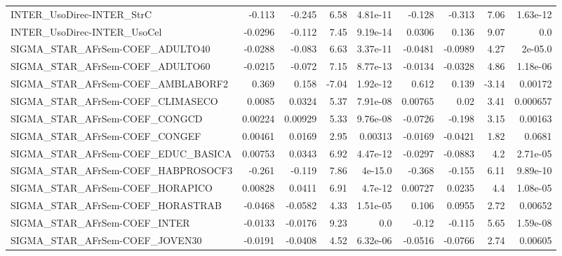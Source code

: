 \begin{tabular}{lrrrrrrrr}
INTER\_UsoDirec-INTER\_StrC              &      -0.113 &       -0.245 &     6.58 & 4.81e-11 &     -0.128 &      -0.313 &         7.06 &      1.63e-12 \\
INTER\_UsoDirec-INTER\_UsoCel            &     -0.0296 &       -0.112 &     7.45 & 9.19e-14 &     0.0306 &       0.136 &         9.07 &           0.0 \\
SIGMA\_STAR\_AFrSem-COEF\_ADULTO40        &     -0.0288 &       -0.083 &     6.63 & 3.37e-11 &    -0.0481 &     -0.0989 &         4.27 &       2e-05.0 \\
SIGMA\_STAR\_AFrSem-COEF\_ADULTO60        &     -0.0215 &       -0.072 &     7.15 & 8.77e-13 &    -0.0134 &     -0.0328 &         4.86 &      1.18e-06 \\
SIGMA\_STAR\_AFrSem-COEF\_AMBLABORF2      &       0.369 &        0.158 &    -7.04 & 1.92e-12 &      0.612 &       0.139 &        -3.14 &       0.00172 \\
SIGMA\_STAR\_AFrSem-COEF\_CLIMASECO       &      0.0085 &       0.0324 &     5.37 & 7.91e-08 &    0.00765 &        0.02 &         3.41 &      0.000657 \\
SIGMA\_STAR\_AFrSem-COEF\_CONGCD          &     0.00224 &      0.00929 &     5.33 & 9.76e-08 &    -0.0726 &      -0.198 &         3.15 &       0.00163 \\
SIGMA\_STAR\_AFrSem-COEF\_CONGEF          &     0.00461 &       0.0169 &     2.95 &  0.00313 &    -0.0169 &     -0.0421 &         1.82 &        0.0681 \\
SIGMA\_STAR\_AFrSem-COEF\_EDUC\_BASICA     &     0.00753 &       0.0343 &     6.92 & 4.47e-12 &    -0.0297 &     -0.0883 &          4.2 &      2.71e-05 \\
SIGMA\_STAR\_AFrSem-COEF\_HABPROSOCF3     &      -0.261 &       -0.119 &     7.86 &  4e-15.0 &     -0.368 &      -0.155 &         6.11 &      9.89e-10 \\
SIGMA\_STAR\_AFrSem-COEF\_HORAPICO        &     0.00828 &       0.0411 &     6.91 &  4.7e-12 &    0.00727 &      0.0235 &          4.4 &      1.08e-05 \\
SIGMA\_STAR\_AFrSem-COEF\_HORASTRAB       &     -0.0468 &      -0.0582 &     4.33 & 1.51e-05 &      0.106 &      0.0955 &         2.72 &       0.00652 \\
SIGMA\_STAR\_AFrSem-COEF\_INTER           &     -0.0133 &      -0.0176 &     9.23 &      0.0 &      -0.12 &      -0.115 &         5.65 &      1.59e-08 \\
SIGMA\_STAR\_AFrSem-COEF\_JOVEN30         &     -0.0191 &      -0.0408 &     4.52 & 6.32e-06 &    -0.0516 &     -0.0766 &         2.74 &       0.00605 \\

\end{tabular}
